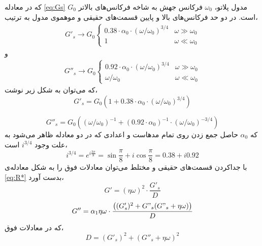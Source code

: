 که در معادله \ref{eq:Gs} $G_0$ مدول پلاتو، $\omega_0$ فرکانس جهش به شاخه فرکانس‌های بالاتر است. در دو حد فرکانس‌های بالا و پایین قسمت‌های حقیقی و موهموی مدول به ترتیب،
\begin{equation}
\begin{aligned}
G'_s\rightarrow G_0
  \begin{cases}
    0.38\cdot\alpha_0\cdot(\omega/\omega_0)^{3/4}       & \omega\gg\omega_0\\
    1       & \omega\ll\omega_0
  \end{cases}
\end{aligned}
\end{equation}
و
\begin{equation}
\begin{aligned}
G''_s\rightarrow G_0
  \begin{cases}
    0.92\cdot\alpha_0\cdot(\omega/\omega_0)^{3/4}       & \omega\gg\omega_0\\
    \omega/\omega_0       & \omega\ll\omega_0
  \end{cases}
\end{aligned}
\end{equation}
که می‌توان به شکل زیر نوشت،
\begin{equation}
G'_s=G_0(1+0.38\cdot\alpha_0\cdot(\omega/\omega_0)^{3/4})
\end{equation}


\begin{equation}
G''_s=G_0((\omega/\omega_0)^{-1}+(0.92\cdot\alpha_0)^{-1}\cdot(\omega/\omega_0)^{-3/4})
\end{equation}
که $\alpha_0$ حاصل جمع زدن روی تمام مدهاست و اعدادی که در دو معادله ظاهر می‌شود به علت وجود $i^{3/4}$ است،
\begin{equation}
i^{3/4}=e^{i\frac{3\pi}{8}}=\sin\frac{\pi}{8}+i\cos\frac{\pi}{8}=0.38+i0.92
\end{equation}
با جداکردن قسمت‌های حقیقی و مختلط می‌توان معادلات فوق را به شکل معادله‌ی \ref{eq:R*} بدست آورد،
\begin{equation}
G'=(\eta\omega)^2\cdot\frac{G'_s}{D}
\label{eq:g'}
\end{equation}
\begin{equation}
G''=\alpha_1\eta\omega\cdot\frac{\left((G'_s)^2+G"_s(G"_s+\eta\omega)\right)}{D}
\label{eq:g''}
\end{equation}
که در معادلات فوق،
\begin{equation}
D=(G'_s)^2+(G''_s+\eta\omega)^2
\end{equation}


